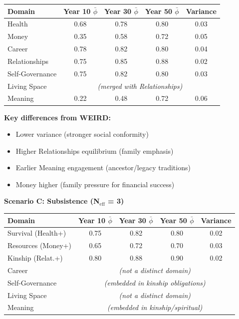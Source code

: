 \begin{center}
\small
\begin{tabular}{@{}lcccc@{}}
\toprule
\textbf{Domain} & \textbf{Year 10 $\bar{\phi}$} & \textbf{Year 30 $\bar{\phi}$} & \textbf{Year 50 $\bar{\phi}$} & \textbf{Variance} \\
\midrule
Health & 0.68 & 0.78 & 0.80 & 0.03 \\
Money & 0.35 & 0.58 & 0.72 & 0.05 \\
Career & 0.78 & 0.82 & 0.80 & 0.04 \\
Relationships & 0.75 & 0.85 & 0.88 & 0.02 \\
Self-Governance & 0.75 & 0.82 & 0.80 & 0.03 \\
Living Space & \multicolumn{4}{c}{\textit{(merged with Relationships)}} \\
Meaning & 0.22 & 0.48 & 0.72 & 0.06 \\
\bottomrule
\end{tabular}
\end{center}

\textbf{Key differences from WEIRD:}
\begin{itemize}[nosep]
\item Lower variance (stronger social conformity)
\item Higher Relationships equilibrium (family emphasis)
\item Earlier Meaning engagement (ancestor/legacy traditions)
\item Money higher (family pressure for financial success)
\end{itemize}

\textbf{Scenario C: Subsistence (N$_{\text{eff}}$ = 3)}

\begin{center}
\small
\begin{tabular}{@{}lcccc@{}}
\toprule
\textbf{Domain} & \textbf{Year 10 $\bar{\phi}$} & \textbf{Year 30 $\bar{\phi}$} & \textbf{Year 50 $\bar{\phi}$} & \textbf{Variance} \\
\midrule
Survival (Health+) & 0.75 & 0.82 & 0.80 & 0.02 \\
Resources (Money+) & 0.65 & 0.72 & 0.70 & 0.03 \\
Kinship (Relat.+) & 0.80 & 0.88 & 0.90 & 0.02 \\
Career & \multicolumn{4}{c}{\textit{(not a distinct domain)}} \\
Self-Governance & \multicolumn{4}{c}{\textit{(embedded in kinship obligations)}} \\
Living Space & \multicolumn{4}{c}{\textit{(not a distinct domain)}} \\
Meaning & \multicolumn{4}{c}{\textit{(embedded in kinship/spiritual)}} \\
\bottomrule
\end{tabular}
\end{center}

